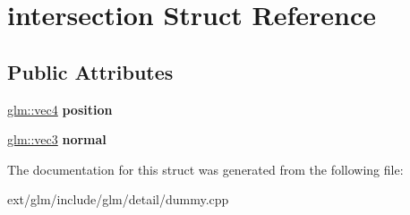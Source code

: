 \hypertarget{structintersection}{\section{intersection Struct Reference}
\label{structintersection}
}
\subsection*{Public Attributes}
\begin{DoxyCompactItemize}
\item 
\hypertarget{structintersection_a7a33f425d759e3e1240499a7f527b914}{\hyperlink{group__core__types_ga5881b1b022d7fd1b7218f5916532dd02}{glm\-::vec4} {\bfseries position}}\label{structintersection_a7a33f425d759e3e1240499a7f527b914}

\item 
\hypertarget{structintersection_a4db60aeaf032905a89ca8382914b44e4}{\hyperlink{group__core__types_ga1c47e8b3386109bc992b6c48e91b0be7}{glm\-::vec3} {\bfseries normal}}\label{structintersection_a4db60aeaf032905a89ca8382914b44e4}

\end{DoxyCompactItemize}


The documentation for this struct was generated from the following file\-:\begin{DoxyCompactItemize}
\item 
ext/glm/include/glm/detail/dummy.\-cpp\end{DoxyCompactItemize}
